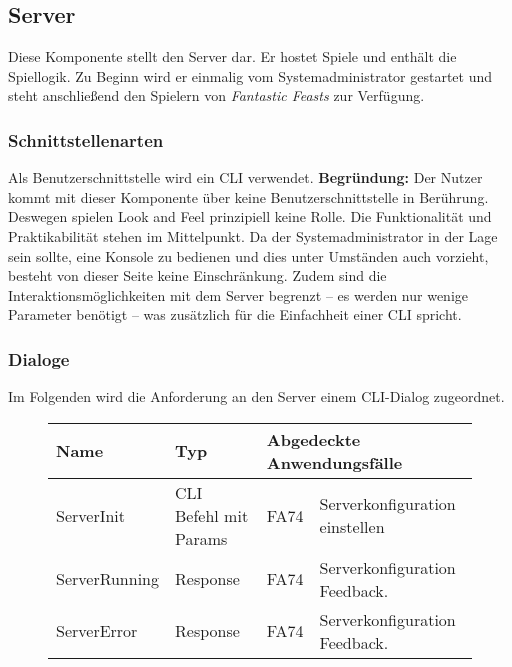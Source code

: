 \subsection{Server}
Diese Komponente stellt den Server dar. Er hostet Spiele und enthält die Spiellogik. Zu Beginn wird er einmalig vom Systemadministrator gestartet und steht anschließend den Spielern von \textit{Fantastic Feasts} zur Verfügung.

\subsubsection{Schnittstellenarten}
Als Benutzerschnittstelle wird ein CLI verwendet. \textbf{Begründung:} Der Nutzer kommt mit dieser Komponente über keine Benutzerschnittstelle in Berührung. Deswegen spielen Look and Feel prinzipiell keine Rolle. Die Funktionalität und Praktikabilität stehen im Mittelpunkt. Da der Systemadministrator in der Lage sein sollte, eine Konsole zu bedienen und dies unter Umständen auch vorzieht, besteht von dieser Seite keine Einschränkung. Zudem sind die Interaktionsmöglichkeiten mit dem Server begrenzt – es werden nur wenige Parameter benötigt – was zusätzlich für die Einfachheit einer CLI spricht.

\subsubsection{Dialoge}
Im Folgenden wird die Anforderung an den Server einem CLI-Dialog zugeordnet.

\begin{figure}[H]
    \centering
    \begin{tabular}{| l l l l |}
    \hline
    \textbf{Name} & \textbf{Typ} & \multicolumn{2}{l|}{\textbf{Abgedeckte Anwendungsfälle}} \\\hline
    ServerInit & CLI Befehl mit Params & FA74 & Serverkonfiguration einstellen \\\hline
    ServerRunning & Response & FA74 & Serverkonfiguration Feedback.\\\hline
    ServerError & Response & FA74 & Serverkonfiguration Feedback.\\\hline
    
    \end{tabular}
\end{figure}

